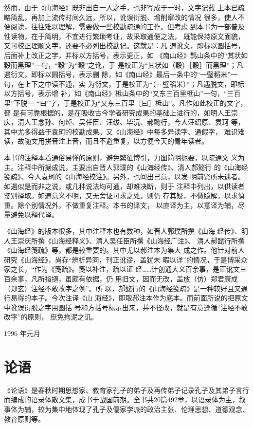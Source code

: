 \documentclass[a4paper,12pt,UTF8,twoside]{ctexbook}
\begin{document}
然而，由于《山海经》既非出自一人之手，也非写成于一时，文字记载 上本已疏略简乱，再加上流传时间久远，所以，讹误衍脱、增削窜改的情况 很多，使人不便阅读，往往难以理解，需要做一些校勘疏通的工作。但考虑 到本书为一部普及性读物，在于简明，不宜进行繁琐考证，故采取通便之法， 既能保持原文面貌，又可校正理顺文字，还要不必列出校勘记。这就是：凡 遇讹文，即标以圆括号，后面补上改正之字，并标以方括号，表示更正，如 《南山经》鹊山条中的“其状如穀而黑理”一句，“穀”为“榖”之讹，于 是校正为“其状如（穀）［榖］而黑理”；凡遇衍文，即标以圆括号，表示删 除，如《南山经》最后一条中的“一璧稻米”一句，在上下之中读不通，实 为衍文，于是校正为“（一璧稻米）”；凡遇脱文，即标以方括号，表示增 补，如《南山经》柢山条中的“又东三百里柢山”一句，“三百里”下脱一 “曰”字，于是校正为“又东三百里［曰］柢山”。凡作如此校正的文字，都 是有可靠根据的，是在吸收古今学者研究成果的基础上进行的，如明人王崇 庆，清人王念孙、何焯、吴任臣、汪绂、毕沅、郝懿行，今人汪绍原、袁珂 等，其中尤多得益于袁珂的校勘成果。又《山海经》中每多异读字、通假字， 难识难读，故随文用拼音注上音，而且不避重复，以方便今天的青年读者。

本书的注释本着通俗易懂的原则，避免繁征博引，力图简明扼要，以疏通文 义为主。注释中所据成说，主要出自晋人郭璞的《山海经传》、清人郝懿行 的《山海经笺疏》、今人袁珂的《山海经校注》。另外，也间出己意，以发 明前贤所未逮者。如遇似是而非之说，或几种说法均可通，却难决断，则于 注释中列出，以供读者鉴别择取。如遇意义不明，又无旁证可求之处，则仍 存其疑，不做臆解，以求慎重。除个别情况外，不做重复注释。本书的译文， 以直译为主，以意译为辅，尽量避免以释代译。

《山海经》的版本很多，其中注释本也有数种，如晋人郭璞所撰《山海 经传》、明人王崇庆所撰《山海经释义》、清人吴任臣所撰《山海经广注》、 清人郝懿行所撰《山海经笺疏》等，都是较重要的。其中尤以郝注本为集大 成之作。他针对前人研究《山海经》，尚存“辨析异同，刊正讹谬，盖犹未 暇以详”的情况，于是博采众家之长，“作为《笺疏》。笺以补注，疏以证 经……计创通大义百余事，是正讹文三百余事，凡所指擿，虽颇有依据，仍 用旧文，因而无改，盖放（仿）郑君康成（郑玄）注经不敢改字之例”。所 以，郝懿行的《山海经笺疏》是一种较好且又通行易得的本子。今次注译《山 海经》，即取郝注本作为底本。而前面所说的把原文中讹误衍脱之字用圆括 号和方括号标示出来，并不径改，就是有意遵循“注经不敢改字”的原则， 庶免拘泥之讥。

1996 年元月


\chapter{论语}

《论语》是春秋时期思想家、教育家孔子的弟子及再传弟子记录孔子及其弟子言行而编成的语录体散文集，成书于战国前期。全书共20篇492章，以语录体为主，叙事体为辅，较为集中地体现了孔子及儒家学派的政治主张、伦理思想、道德观念、教育原则等。
\end{document}
